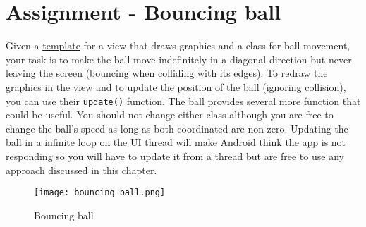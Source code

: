 \section{Assignment - Bouncing ball}
\begin{minipage}{0.4\textwidth}
Given a \href{https://github.com/JonSteinn/AndroidDevelopment/tree/master/templates/lab2}{template} for a view that draws graphics and a class for ball movement, your task is to make the ball move indefinitely in a diagonal direction but never leaving the screen (bouncing when colliding with its edges). To redraw the graphics in the view and to update the position of the ball (ignoring collision), you can use their \texttt{update()} function. The ball provides several more function that could be useful. You should not change either class although you are free to change the ball's speed as long as both coordinated are non-zero. Updating the ball in a infinite loop on the UI thread will make Android think the app is not responding so you will have to update it from a thread but are free to use any approach discussed in this chapter.
\end{minipage}
\hspace{2cm}
\begin{minipage}{0.4\textwidth}
\begin{figure}[H]
\centering
\texttt{[image: bouncing\_ball.png]}
\caption{Bouncing ball}
\label{fig:bball}
\end{figure}
\end{minipage}


